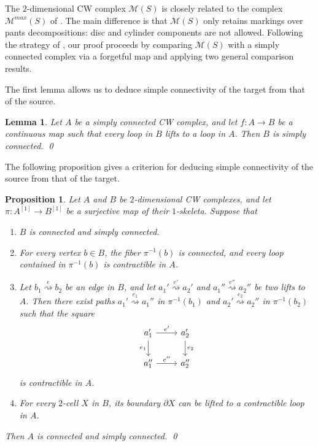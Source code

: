 \documentclass{amsart}
\newcommand{\calM}{\mathcal{M}}
\newcommand{\xra}[1]{\overset{#1}{\rightsquigarrow}}
\newcommand{\surf}{S}%
\newcommand{\Mmax}{\mathcal{M}^{max}}
\newtheorem{prop}[theorem]{Proposition}%
\newtheorem{lemma}[theorem]{Lemma}%
\theoremstyle{definition}
\numberwithin{equation}{section}
\begin{document}
The $2$-dimensional CW complex $\calM(\surf)$ is closely related to the complex $\Mmax(\surf)$ of \cite{bk_marked_surfaces}. The main difference is that $\calM(\surf)$ only retains markings over pants decompositions: disc and cylinder components are not allowed. Following the strategy of \cite{bk_marked_surfaces,complex_of_pants_decomp}, our proof proceeds by comparing $\calM(\surf)$ with a simply connected complex via a forgetful map and applying two general comparison results.

The first lemma allows us to deduce simple connectivity of the target from that of the source.

\begin{lemma}\label{lemma: simply-connect target from domain}
    Let $A$ be a simply connected CW complex, and let $f:A\to B$ be a continuous map such that every loop in $B$ lifts to a loop in $A$. Then $B$ is simply connected. \qed
\end{lemma}

The following proposition gives a criterion for deducing simple connectivity of the source from that of the target.

\begin{prop}\label{prop: simply-connect domain from target}
    Let $A$ and $B$ be $2$-dimensional CW complexes, and let $\pi:A^{[1]}\to B^{[1]}$ be a surjective map of their $1$-skeleta. Suppose that
    \begin{enumerate}
        \item $B$ is connected and simply connected.
        \item For every vertex $b\in B$, the fiber $\pi^{-1}(b)$ is connected, and every loop contained in $\pi^{-1}(b)$ is contractible in $A$.
        \item Let $b_1\xra{e} b_2$ be an edge in $B$, and let $a_1'\xra{e'}a_2'$ and $a_1''\xra{e''}a_2''$ be two lifts to $A$. Then there exist paths $a_1'\xra{e_1}a_1''$ in $\pi^{-1}(b_1)$ and $a_2'\xra{e_2}a_2''$ in $\pi^{-1}(b_2)$ such that the square
            \[
            \begin{tikzcd}
            	{a_1'} & {a_2'} \\
            	{a_1''} & {a_2''}
            	\arrow["{e'}", from=1-1, to=1-2]
            	\arrow["{e_1}"', from=1-1, to=2-1]
            	\arrow["{e_2}", from=1-2, to=2-2]
            	\arrow["{e''}", from=2-1, to=2-2]
            \end{tikzcd}
            \]
        is contractible in $A$.
        \item For every $2$-cell $X$ in $B$, its boundary $\partial X$ can be lifted to a contractible loop in $A$.
    \end{enumerate}
    Then $A$ is connected and simply connected. \qed
\end{prop}
\end{document}
